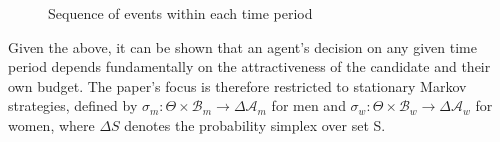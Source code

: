 \begin{figure}[ht]
    \centering
    \caption{Sequence of events within each time period} \label{fig:timeline}
\end{figure}

Given the above, it can be shown that an agent’s decision on any given time period depends fundamentally on the attractiveness of the candidate and their own budget. The paper's focus is therefore restricted to stationary Markov strategies, defined by $\sigma_m: \Theta \times\mathcal{B}_m\rightarrow \Delta\mathcal{A}_m$ for men and $\sigma_w:\Theta \times\mathcal{B}_w\rightarrow \Delta\mathcal{A}_w$ for women, where $\Delta S$ denotes the probability simplex over set S. 

